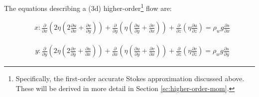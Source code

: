 %
%
%

The equations describing a (3d) higher-order\footnote{Specifically, the first-order accurate Stokes approximation discussed above. These will be derived in more detail in Section \ref{sc:higher-order-mom}.} flow are:

\begin{align*}
  & x: \frac{\partial}{\partial x}\left ( 2 \eta  
\left(2\frac{\partial u}{\partial x}+\frac{\partial v}{\partial y}\right)\right)
+\frac{\partial}{\partial y}\left(\eta \left(
\frac{\partial u}{\partial y}+\frac{\partial v}{\partial x}\right)\right)
+\frac{\partial}{\partial z}\left(\eta \frac{\partial u}{\partial z}\right)
=\rho_w g \frac{\partial s}{\partial x}
\end{align*}


\begin{align*}
  & y: \frac{\partial}{\partial y}\left ( 2 \eta 
\left(2\frac{\partial v}{\partial y}+\frac{\partial u}{\partial x}\right)\right)
+\frac{\partial}{\partial x}\left(\eta \left(
\frac{\partial u}{\partial y}+\frac{\partial v}{\partial x}\right)\right)
+\frac{\partial}{\partial z}\left(\eta \frac{\partial v}{\partial z}\right)
=\rho_w g \frac{\partial s}{\partial y}
\end{align*}

